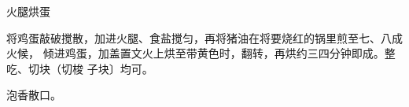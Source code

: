 \begin{recipe}{火腿烘蛋}

\ingredients


\cooking

将鸡蛋敲破搅散，加进火腿、食盐搅匀，再将猪油在将要烧红的锅里煎至七、八成火候，
倾进鸡蛋，加盖置文火上烘至带黄色时，翻转，再烘约三四分钟即成。整吃、切块（切梭
子块〕均可。

\notes

泡香散口。

\end{recipe}

